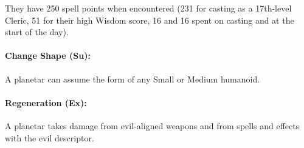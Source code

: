 They have 250 spell points when encountered (231 for casting as a 17th-level Cleric, 51 for their high Wisdom score, 16 and 16 spent on casting  and  at the start of the day).
\paragraph{Change Shape (Su):}
A planetar can assume the form of any Small or Medium humanoid.
\paragraph{Regeneration (Ex):} A planetar takes damage from evil-aligned weapons and from spells and effects with the evil descriptor.